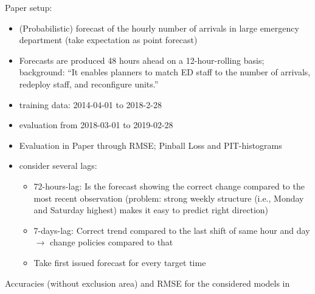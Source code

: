 \textcite{Rostami-Tabar2023}

Paper setup:

\begin{itemize}
    \item (Probabilistic) forecast of the hourly number of arrivals in large emergency department (take expectation as point forecast)
    \item Forecasts are produced 48 hours ahead on a 12-hour-rolling basis; background: \enquote{It enables planners to match ED staff to the number of arrivals, redeploy staff, and reconfigure units.}
    \item training data: 2014-04-01 to 2018-2-28
    \item evaluation from 2018-03-01 to 2019-02-28
    \item Evaluation in Paper through RMSE; Pinball Loss and PIT-histograms
    \item consider several lags:
    \begin{itemize}
        \item 72-hours-lag: Is the forecast showing the correct change compared to the most recent observation (problem: strong weekly structure (i.e., Monday and Saturday highest) makes it easy to predict right direction)
        \item 7-days-lag: Correct trend compared to the last shift of same hour and day $\rightarrow$ change policies compared to that
        \item Take first issued forecast for every target time
    \end{itemize}
\end{itemize}

\begin{table}
\centering

\caption{Accuracies (without exclusion area) and RMSE for the considered models in \textcite{Rostami-Tabar2023}}	
\end{table}

